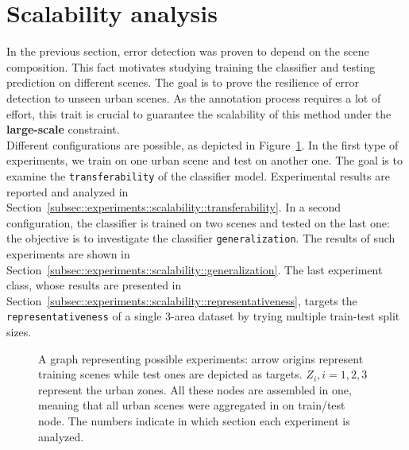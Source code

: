 \section{Scalability analysis}
    \label{sec::experiments::scalability}
    In the previous section, error detection was proven to depend on the scene composition.
    This fact motivates studying training the classifier and testing prediction on different scenes.
    The goal is to prove the resilience of error detection to unseen urban scenes.
    As the annotation process requires a lot of effort, this trait is crucial to guarantee the scalability of this method under the \textbf{large-scale} constraint.\\

    Different configurations are possible, as depicted in Figure~\ref{fig::scalability_study}.
    In the first type of experiments, we train on one urban scene and test on another one.
    The goal is to examine the \texttt{transferability} of the classifier model.
    Experimental results are reported and analyzed in Section~\ref{subsec::experiments::scalability::transferability}.
    In a second configuration, the classifier is trained on two scenes and tested on the last one: the objective is to investigate the classifier \texttt{generalization}.
    The results of such experiments are shown in Section~\ref{subsec::experiments::scalability::generalization}.
    The last experiment class, whose results are presented in Section~\ref{subsec::experiments::scalability::representativeness}, targets the \texttt{representativeness} of a single 3-area dataset by trying multiple train-test split sizes.\\

    \begin{figure}[htbp]
        \ffigbox[\FBwidth]{
            
        }
        {
            \caption[
                A graph representing possible experiments: arrow origins represent training scenes while test ones are depicted as targets.
            ]{
                \label{fig::scalability_study}
                A graph representing possible experiments: arrow origins represent training scenes while test ones are depicted as targets.
                \(Z_i, i=1,2,3\) represent the urban zones.
                All these nodes are assembled in one, meaning that all urban scenes were aggregated in on train/test node.
                The numbers indicate in which section each experiment is analyzed.
            }
        }
    \end{figure}

